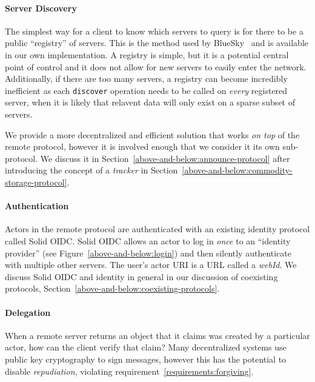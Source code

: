 \paragraph{Server Discovery}

The simplest way for a client to know which
servers to query is for there to
be a public ``registry'' of servers.
This is the method used by BlueSky~\cite{bluesky}
and is available in our
own implementation.
A registry is simple, but it is a potential central point of control
and it does not allow for new
servers to easily enter the network.
Additionally, if there are too many servers, a registry can become
incredibly inefficient as each \texttt{discover} operation needs to be called
on \emph{every} registered server, when it is likely that relavent data
will only exist on a sparse subset of servers.

We provide a more decentralized and efficient
solution that works \emph{on top} of the remote protocol,
however it is involved enough that we consider it its own sub-protocol.
We discuss it in Section~\ref{above-and-below:announce-protocol} after introducing the concept
of a \emph{tracker}
in Section~\ref{above-and-below:commodity-storage-protocol}.

\paragraph{Authentication}
Actors in the remote protocol are authenticated with an existing
identity protocol called Solid OIDC.
Solid OIDC allows an actor to log in \emph{once} to an
``identity provider'' (see Figure~\ref{above-and-below:login})
and then silently authenticate with multiple
other servers.
The user's actor URI is a URL called a \emph{webId}.
We discuss Solid OIDC and identity in general in our discussion of
coexisting protocols, Section~\ref{above-and-below:coexisting-protocols}.

\paragraph{Delegation}
\label{above-and-below:delegation}

When a remote server returns an object that it claims
was created by a particular actor, how can the client verify that claim?
Many decentralized systems use public key cryptography to sign messages,
however this has the potential to disable \emph{repudiation},
violating requirement~\ref{requirements:forgiving}.

